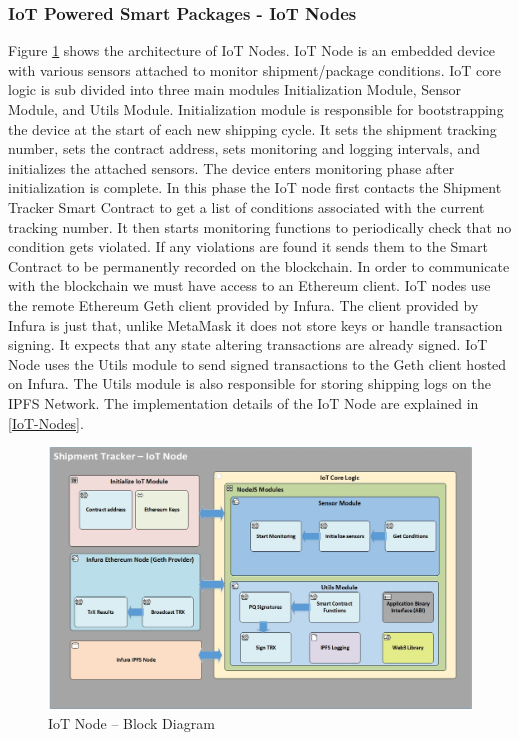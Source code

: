 \subsubsection{IoT Powered Smart Packages - IoT Nodes} \label{IoTNode} 
Figure \ref{fig:ArchitectureIoT} shows the architecture of IoT Nodes.  IoT Node is an embedded device with various sensors attached to monitor shipment/package conditions. IoT core logic is sub divided into three main modules Initialization Module, Sensor Module, and Utils Module. Initialization module is responsible for bootstrapping the device at the start of each new shipping cycle. It sets the shipment tracking number, sets the contract address, sets monitoring and logging intervals, and initializes the attached sensors. The device enters monitoring phase after initialization is complete. In this phase the IoT node first contacts the Shipment Tracker Smart Contract to get a list of conditions associated with the current tracking number. It then starts monitoring functions to periodically check that no condition gets violated. If any violations are found it sends them to the Smart Contract to be permanently recorded on the blockchain. In order to communicate with the blockchain we must have access to an Ethereum client. IoT nodes use the remote Ethereum Geth client provided by Infura. The client provided by Infura is just that, unlike MetaMask it does not store keys or handle transaction signing. It expects that any state altering transactions are already signed. IoT Node uses the Utils module to send signed transactions to the Geth client hosted on Infura. The Utils module is also responsible for storing shipping logs on the IPFS Network.  The implementation details of the IoT Node are explained in \ref{IoT-Nodes}.

\begin{figure}[h]
	\centering
    \includegraphics[width=180mm,scale=1]{figs/IoTNode-BD}
	\caption{IoT Node – Block Diagram}
	\label{fig:ArchitectureIoT} 
\end{figure}
\clearpage


